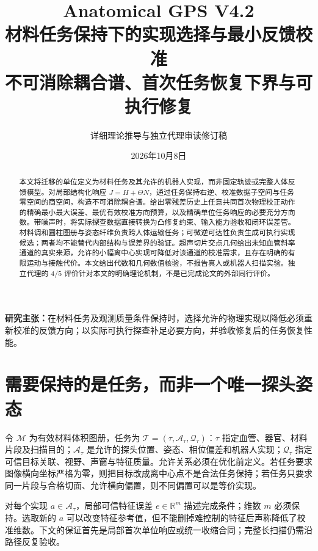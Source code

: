 \documentclass[11pt,a4paper]{article}
\numberwithin{equation}{section}
\theoremstyle{definition}
\newcommand{\R}{\mathbb R}
\begin{document}
\title{Anatomical GPS V4.2\\[2mm]\Large 材料任务保持下的实现选择与最小反馈校准\\[2mm]\large 不可消除耦合谱、首次任务恢复下界与可执行修复}
\author{详细理论推导与独立代理审读修订稿}
\date{2026年10月8日}
\maketitle
\begin{abstract}
本文将迁移的单位定义为材料任务及其允许的机器人实现，而非固定轨迹或完整人体反馈模型。对局部结构化响应 $J=H+\Theta N$，通过任务保持右逆、校准数据子空间与任务零空间的商空间，构造不可消除耦合谱。给出零残差历史上任意共同首次物理校正动作的精确最小最大误差、最优有效校准方向预算，以及精确单位任务响应的必要充分方向数。带噪声时，将实际探查数据直接转换为凸修复约束、输入能力验收和闭环误差管。材料调和圆柱图册与姿态纤维负责跨人体运输任务；可微逆可达性负责生成可执行实现候选；两者均不能替代内部结构与误差界的验证。超声切片交点几何给出未知血管斜率通道的真实来源，允许的小幅离中心实现可降低对该通道的校准需求，且存在明确的有限运动与接触代价。本文给出代数和几何数值核验，不报告真人或机器人扫描实验。独立代理的 $4/5$ 评价针对本文的明确理论机制，不是已完成论文的外部同行评价。
\end{abstract}
\noindent\textbf{研究主张：}在材料任务及观测质量条件保持时，选择允许的物理实现以降低必须重新校准的反馈方向；以实际可执行探查补足必要方向，并验收修复后的任务恢复性能。
\newpage
\begingroup
\footnotesize
\setlength{\parskip}{0pt}
\tableofcontents
\endgroup
\newpage

\section{需要保持的是任务，而非一个唯一探头姿态}
令 $\mathcal M$ 为有效材料体积图册，任务为 $\mathcal T=(\tau,\mathcal A_\tau,\mathcal Q_\tau)$：$\tau$ 指定血管、器官、材料片段及扫描目的；$\mathcal A_\tau$ 是允许的探头位置、姿态、相位偏差和机器人实现；$\mathcal Q_\tau$ 指定可信目标关联、视野、声窗与特征质量。允许关系必须在优化前定义。若任务要求图像横向坐标严格为零，则把目标改成离中心点不是合法任务保持；若任务只要求同一片段与合格切面、允许横向偏置，则不同偏置可以是等价实现。

对每个实现 $a\in\mathcal A_\tau$，局部可信特征误差 $e\in\R^m$ 描述完成条件；维数 $m$ 必须保持。选取新的 $a$ 可以改变特征参考值，但不能删掉难控制的特征后声称降低了校准维数。下文的保证首先是局部首次单位响应或统一收缩合同；完整长扫描仍需沿路径反复验收。
\end{document}
